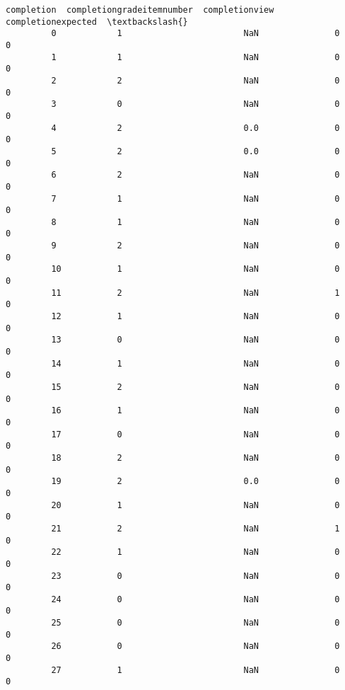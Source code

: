 \documentclass[11pt]{article}
\begin{document}
\begin{Verbatim}[commandchars=\\\{\}]
             completion  completiongradeitemnumber  completionview  completionexpected  \textbackslash{}
         0            1                        NaN               0                   0   
         1            1                        NaN               0                   0   
         2            2                        NaN               0                   0   
         3            0                        NaN               0                   0   
         4            2                        0.0               0                   0   
         5            2                        0.0               0                   0   
         6            2                        NaN               0                   0   
         7            1                        NaN               0                   0   
         8            1                        NaN               0                   0   
         9            2                        NaN               0                   0   
         10           1                        NaN               0                   0   
         11           2                        NaN               1                   0   
         12           1                        NaN               0                   0   
         13           0                        NaN               0                   0   
         14           1                        NaN               0                   0   
         15           2                        NaN               0                   0   
         16           1                        NaN               0                   0   
         17           0                        NaN               0                   0   
         18           2                        NaN               0                   0   
         19           2                        0.0               0                   0   
         20           1                        NaN               0                   0   
         21           2                        NaN               1                   0   
         22           1                        NaN               0                   0   
         23           0                        NaN               0                   0   
         24           0                        NaN               0                   0   
         25           0                        NaN               0                   0   
         26           0                        NaN               0                   0   
         27           1                        NaN               0                   0   

\end{Verbatim}
\end{document}
